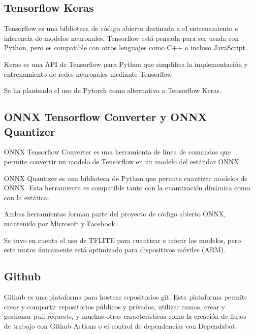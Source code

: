\hypertarget{tensorflow-keras}{%
\subsection{Tensorflow Keras}\label{tensorflow-keras}}

Tensorflow es una biblioteca de código abierto destinada a el
entrenamiento e inferencia de modelos neuronales. Tensorflow está
pensada para ser usada con Python, pero es compatible con otros
lenguajes como C++ o incluso JavaScript.

Keras es una API de Tensorflow para Python que simplifica la
implementación y entrenamiento de redes neuronales mediante Tensorflow.

Se ha planteado el uso de Pytorch como alternativa a Tensorflow Keras.

\hypertarget{section-3}{%
\subsection{}\label{section-3}}

\hypertarget{onnx-tensorflow-converter-y-onnx-quantizer}{%
\subsection{ONNX Tensorflow Converter y ONNX
Quantizer}\label{onnx-tensorflow-converter-y-onnx-quantizer}}

ONNX Tensorflow Converter es una herramienta de línea de comandos que
permite convertir un modelo de Tensorflow en un modelo del estándar
ONNX.

ONNX Quantizer es una biblioteca de Python que permite cuantizar modelos
de ONNX. Esta herramienta es compatible tanto con la cuantización
dinámica como con la estática.

Ambas herramientas forman parte del proyecto de código abierto ONNX,
mantenido por Microsoft y Facebook.

Se tuvo en cuenta el uso de TFLITE para cuantizar e inferir los modelos,
pero este motor únicamente está optimizado para dispositivos móviles
(ARM).

\hypertarget{github}{%
\subsection{Github}\label{github}}

Github es una plataforma para hostear repositorios git. Esta plataforma
permite crear y compartir repositorios públicos y privados, utilizar
ramas, crear y gestionar pull requests, y muchas otras características
como la creación de flujos de trabajo con Github Actions o el control de
dependencias con Dependabot.

